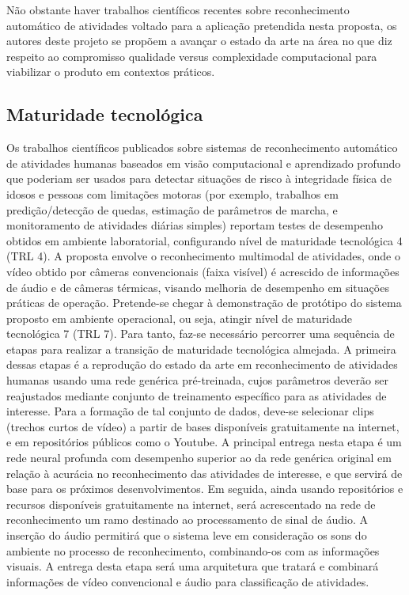 Não obstante haver trabalhos científicos recentes sobre reconhecimento automático de atividades voltado para a aplicação pretendida nesta proposta,  os autores deste projeto se propõem a avançar o estado da arte na área no que diz respeito ao compromisso  qualidade versus complexidade computacional para viabilizar o produto em contextos práticos.

\subsection{Maturidade tecnológica}
\label{ssec:trl}
Os trabalhos científicos publicados sobre sistemas de reconhecimento automático de atividades humanas baseados em visão computacional e aprendizado profundo que poderiam ser usados para detectar situações de risco à integridade física de idosos e pessoas com limitações motoras (por exemplo, trabalhos em predição/detecção de quedas, estimação de parâmetros de marcha, e monitoramento de atividades diárias simples) reportam testes de desempenho obtidos em ambiente laboratorial, configurando nível de maturidade tecnológica 4 (TRL 4). A proposta envolve o reconhecimento multimodal de atividades, onde o vídeo obtido por câmeras convencionais (faixa visível) é acrescido de informações de áudio e de câmeras térmicas, visando melhoria de desempenho em situações práticas de operação. 
Pretende-se chegar à demonstração de protótipo do sistema proposto em ambiente operacional, ou seja, atingir nível de maturidade tecnológica 7 (TRL 7). Para tanto, faz-se necessário percorrer uma sequência de etapas para realizar a transição de maturidade tecnológica almejada.
A primeira dessas etapas é a reprodução do estado da arte em reconhecimento de atividades humanas usando uma rede genérica pré-treinada, cujos parâmetros deverão ser reajustados mediante conjunto de treinamento específico para as atividades de interesse. Para a formação de tal conjunto de dados, deve-se selecionar clips (trechos curtos de vídeo) a partir de bases disponíveis gratuitamente na internet, e em repositórios públicos como o Youtube. A principal entrega nesta etapa é um rede neural profunda com desempenho superior ao da rede genérica original em relação à acurácia no reconhecimento das atividades de interesse, e que servirá de base para os próximos desenvolvimentos. 
Em seguida, ainda usando repositórios e recursos disponíveis gratuitamente na internet, será acrescentado na rede de reconhecimento um ramo destinado ao processamento de sinal de áudio. A inserção do áudio permitirá que o sistema leve em consideração os sons do ambiente no processo de reconhecimento, combinando-os com as informações visuais. A entrega desta etapa será uma arquitetura que tratará e combinará informações de vídeo convencional e áudio para classificação de atividades. 
